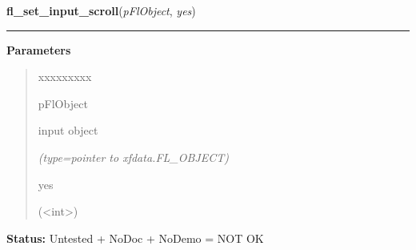 \hspace{.8\funcindent}\begin{boxedminipage}{\funcwidth}

    \raggedright \textbf{fl\_set\_input\_scroll}(\textit{pFlObject}, \textit{yes})

    \vspace{-1.5ex}

    \rule{\textwidth}{0.5\fboxrule}
\setlength{\parskip}{2ex}
\setlength{\parskip}{1ex}
      \textbf{Parameters}
      \vspace{-1ex}

      \begin{quote}
        \begin{Ventry}{xxxxxxxxx}

          \item[pFlObject]

          input object

            {\it (type=pointer to xfdata.FL\_OBJECT)}

          \item[yes]

          ({\textless}int{\textgreater})

        \end{Ventry}

      \end{quote}

\textbf{Status:} Untested + NoDoc + NoDemo = NOT OK



    \end{boxedminipage}

    \label{xformslib:flinput:fl_set_input_cursorpos}

    \vspace{0.5ex}

